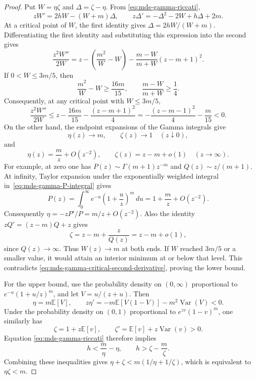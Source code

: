 \documentclass[11pt]{article}
\theoremstyle{definition}
\theoremstyle{remark}
\DeclareMathOperator{\Var}{Var}
\newcommand{\E}{\mathbb E}
\newcommand{\1}{\mathbf 1}
\begin{document}
\begin{proof}
Put \(W=\eta\zeta\) and \(\Delta=\zeta-\eta\).  From \eqref{eq:mds-gamma-riccati},
\[
  zW'=2hW-(W+m)\Delta,
  \qquad
  z\Delta'=-\Delta^2-2W+h\Delta+2m.
\]
At a critical point of \(W\), the first identity gives
\(\Delta=2hW/(W+m)\).  Differentiating the first identity and substituting this expression into the second gives
\begin{equation}
\label{eq:mds-gamma-critical-second-derivative}
  \frac{z^2W''}{2W}
  =z-\left(\frac{m^2}{W}-W\right)
     -\frac{m-W}{m+W}(z-m+1)^2.
\end{equation}
If \(0<W\le3m/5\), then
\[
  \frac{m^2}{W}-W\ge\frac{16m}{15},
  \qquad
  \frac{m-W}{m+W}\ge\frac14.
\]
Consequently, at any critical point with \(W\le3m/5\),
\[
  \frac{z^2W''}{2W}
  \le z-\frac{16m}{15}-\frac{(z-m+1)^2}{4}
  =-\frac{(z-m-1)^2}{4}-\frac m{15}<0.
\]
On the other hand, the endpoint expansions of the Gamma integrals give
\[
  \eta(z)\longrightarrow m,
  \qquad \zeta(z)\longrightarrow1
  \quad(z\downarrow0),
\]
and
\[
  \eta(z)=\frac mz+O(z^{-2}),
  \qquad \zeta(z)=z-m+o(1)
  \quad(z\to\infty).
\]
For example, at zero one has
\(P(z)\sim\Gamma(m+1)z^{-m}\) and \(Q(z)\sim z/(m+1)\).
At infinity, Taylor expansion under the exponentially weighted integral
in~\eqref{eq:mds-gamma-P-integral} gives
\[
 P(z)=\int_0^\infty e^{-u}\left(1+\frac uz\right)^m\,du
     =1+\frac mz+O(z^{-2}).
\]
Consequently \(\eta=-zP'/P=m/z+O(z^{-2})\).  Also the identity
\(zQ'=(z-m)Q+z\) gives
\[
 \zeta=z-m+\frac z{Q(z)}=z-m+o(1),
\]
since \(Q(z)\to\infty\).  Thus \(W(z)\to m\) at both ends.  If \(W\) reached \(3m/5\) or a smaller value, it would attain an interior minimum at or below that level.  This contradicts \eqref{eq:mds-gamma-critical-second-derivative}, proving the lower bound.

For the upper bound, use the probability density on \((0,\infty)\) proportional to \(e^{-u}(1+u/z)^m\), and let \(V=u/(z+u)\).  Then
\begin{equation}\label{eq:mds-gamma-eta-decrease}
  \eta=m\E[V],
  \qquad
  z\eta'=-m\E[V(1-V)]-m^2\Var(V)<0.
\end{equation}
Under the probability density on \((0,1)\) proportional to \(e^{zv}(1-v)^m\), one similarly has
\[
  \zeta=1+z\E[v],
  \qquad
  \zeta'=\E[v]+z\Var(v)>0.
\]
Equation \eqref{eq:mds-gamma-riccati} therefore implies
\[
  h<\frac m\eta-\eta,
  \qquad
  h>\zeta-\frac m\zeta.
\]
Combining these inequalities gives
\(\eta+\zeta<m(1/\eta+1/\zeta)\), which is equivalent to \(\eta\zeta<m\).
\end{proof}
\end{document}
